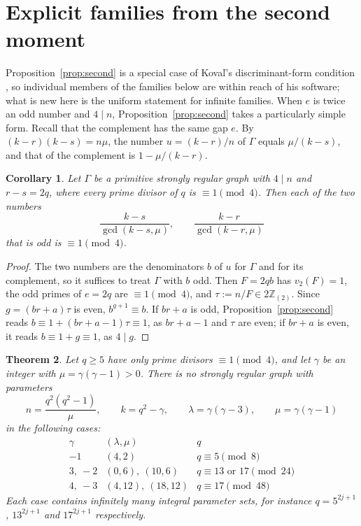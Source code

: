 \documentclass[11pt]{article}
\newtheorem{theorem}{Theorem}[section]
\newtheorem{corollary}[theorem]{Corollary}
\theoremstyle{definition}
\theoremstyle{remark}
\newcommand{\Z}{\mathbb Z}
\newcommand{\Zt}{\Z_{(2)}}
\begin{document}
\section{Explicit families from the second moment}\label{sec:second}

Proposition~\ref{prop:second} is a special case of Kova\v l's
discriminant-form condition \cite{Koval}, so individual members of the families
below are within reach of his software; what is new here is the uniform
statement for infinite families. When $e$ is twice an odd number and
$4\mid n$, Proposition~\ref{prop:second} takes a particularly simple form. Recall that the complement has the same gap
$e$. By $(k-r)(k-s)=n\mu$, the number $u=(k-r)/n$ of $\Gamma$ equals
$\mu/(k-s)$, and that of the complement is $1-\mu/(k-r)$.

\begin{corollary}\label{cor:short}
Let $\Gamma$ be a primitive strongly regular graph with $4\mid n$ and $r-s=2q$,
where every prime divisor of $q$ is $\equiv1\pmod 4$. Then each of the two
numbers
\[
 \frac{k-s}{\gcd(k-s,\mu)},\qquad \frac{k-r}{\gcd(k-r,\mu)}
\]
that is odd is $\equiv1\pmod4$.
\end{corollary}

\begin{proof}
The two numbers are the denominators $b$ of $u$ for $\Gamma$ and for its
complement, so it suffices to treat $\Gamma$ with $b$ odd. Then $F=2qb$ has
$v_2(F)=1$, the odd primes of $e=2q$ are $\equiv1\pmod 4$, and
$\tau:=n/F\in2\Zt$. Since $g=(br+a)\tau$ is even, $b^{g+1}\equiv b$. If $br+a$
is odd, Proposition~\ref{prop:second} reads $b\equiv1+(br+a-1)\tau\equiv1$,
as $br+a-1$ and $\tau$ are even; if $br+a$ is even, it reads $b\equiv1+g\equiv1$,
as $4\mid g$.
\end{proof}

\begin{theorem}\label{thm:fixed}
Let $q\ge5$ have only prime divisors $\equiv1\pmod 4$, and let $\gamma$ be an
integer with $\mu=\gamma(\gamma-1)>0$. There is no strongly regular graph with
parameters
\[
 n=\frac{q^2(q^2-1)}{\mu},\qquad k=q^2-\gamma,\qquad \lambda=\gamma(\gamma-3),
 \qquad \mu=\gamma(\gamma-1)
\]
in the following cases:
\[
\begin{array}{c|c|c}
 \gamma &(\lambda,\mu)& q\\\hline
 -1 &(4,2)&q\equiv5\pmod8\\
 3,\ -2 &(0,6),\ (10,6)&q\equiv13\text{ or }17\pmod{24}\\
 4,\ -3 &(4,12),\ (18,12)&q\equiv17\pmod{48}
\end{array}
\]
Each case contains infinitely many integral parameter sets, for instance
$q=5^{2j+1}$, $13^{2j+1}$ and $17^{2j+1}$ respectively.
\end{theorem}
\end{document}
